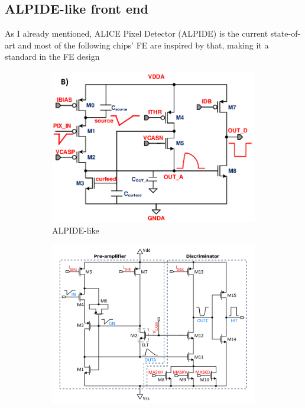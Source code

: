     \subsection{ALPIDE-like front end}
        As I already mentioned, ALICE Pixel Detector (ALPIDE) is the current state-of-art and most of the following chips' FE are inspired by that, making it a standard in the FE design
        \begin{figure}[h!]
            \begin{subfigure}{.5\textwidth}
            \centering
            \includegraphics[width=.98\linewidth]{figures/Monopix1/ALPIDE_FE.png}
            \caption{ALPIDE-like}
            \label{fig:ALPIDE-like}
            \end{subfigure}
            \begin{subfigure}{.5\textwidth}
            \centering
            \includegraphics[width=.98\linewidth]{figures/Monopix1/Monopix1_FE_circuit.png}
            \caption{}
            \label{fig:Monopix1_FE_circuit}
            \end{subfigure}
        \end{figure}

